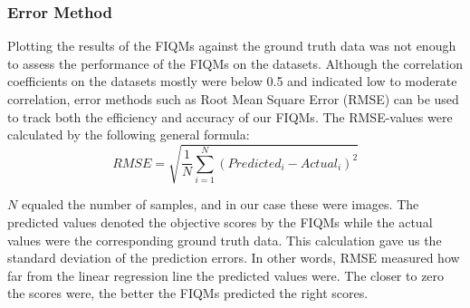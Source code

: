 \subsubsection{Error Method}
Plotting the results of the FIQMs against the ground truth data was not enough to assess the performance of the FIQMs on the datasets. Although the correlation coefficients on the datasets mostly were below 0.5 and indicated low to moderate correlation, error methods such as Root Mean Square Error (RMSE) can be used to track both the efficiency and accuracy of our FIQMs. The RMSE-values were calculated by the following general formula: 
\begin{equation}
    RMSE = \sqrt{\frac{1}{N}\sum _{i=1}^{N}(Predicted_{i} - Actual_{i})^2}
\end{equation}

$N$ equaled the number of samples, and in our case these were images. The predicted values denoted the objective scores by the FIQMs while the actual values were the corresponding ground truth data. This calculation gave us the standard deviation of the prediction errors. In other words, RMSE measured how far from the linear regression line the predicted values were. The closer to zero the scores were, the better the FIQMs predicted the right scores.

